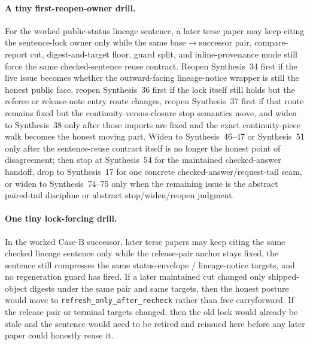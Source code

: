 \documentclass[11pt]{article}
\begin{document}
\paragraph{A tiny first-reopen-owner drill.}
For the worked public-status lineage sentence, a later terse paper may keep citing the sentence-lock owner only while the same base$\to$successor pair, compare-report cut, digest-and-target floor, guard split, and inline-provenance mode still force the same checked-sentence reuse contract. Reopen Synthesis~34 first if the live issue becomes whether the outward-facing lineage-notice wrapper is still the honest public face, reopen Synthesis~36 first if the lock itself still holds but the referee or release-note entry route changes, reopen Synthesis~37 first if that route remains fixed but the continuity-versus-closure stop semantics move, and widen to Synthesis~38 only after those imports are fixed and the exact continuity-piece walk becomes the honest moving part. Widen to Synthesis~46--47 or Synthesis~51 only after the sentence-reuse contract itself is no longer the honest point of disagreement; then stop at Synthesis~54 for the maintained checked-answer handoff, drop to Synthesis~17 for one concrete checked-answer/request-tail seam, or widen to Synthesis~74--75 only when the remaining issue is the abstract paired-tail discipline or abstract stop/widen/reopen judgment.\cite{series:workedexample,series:downstreamnormalforms,series:statusenvelopes,series:challengeroutes,series:challengestops,series:challengebranches,series:challengeanswersheets,series:challengeanswercards,series:challengeanswerpublicationprofiles,series:challengeanswerreviewmenus,series:pairedterminalcitationdiscipline,series:pairedterminalcutoverrules}

\paragraph{One tiny lock-forcing drill.}
In the worked Case-B successor, later terse papers may keep citing the same checked lineage sentence only while the release-pair anchor stays fixed, the sentence still compresses the same status-envelope / lineage-notice targets, and no regeneration guard has fired. If a later maintained cut changed only shipped-object digests under the same pair and same targets, then the honest posture would move to \texttt{refresh\_only\_after\_recheck} rather than free carryforward. If the release pair or terminal targets changed, then the old lock would already be stale and the sentence would need to be retired and reissued here before any later paper could honestly reuse it.\cite{series:workedexample}
\end{document}
